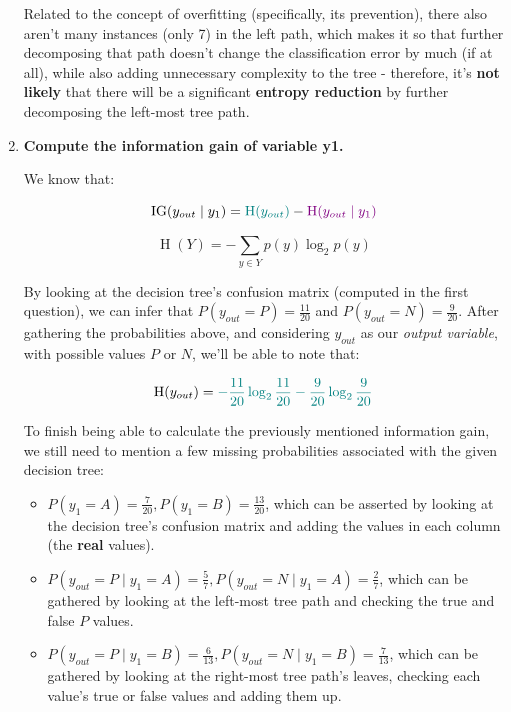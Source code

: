 \documentclass[12pt]{article}
\begin{document}
\begin{enumerate}[leftmargin=\labelsep]
        Related to the concept of overfitting (specifically, its prevention), there also aren't many
        instances (only 7) in the left path, which makes it so that further decomposing that path doesn't
        change the classification error by much (if at all), while also adding unnecessary complexity
        to the tree - therefore, it's \textbf{not likely} that there will be a significant
        \textbf{entropy reduction} by further decomposing the left-most tree path.

  \item \textbf{Compute the information gain of variable y1.}

        We know that:

        \begin{equation}
          \operatorname{IG}(y_{out} \mid y_1) = \textcolor{teal}{\operatorname{H}(y_{out})} - \textcolor{violet}{\operatorname{H}(y_{out} \mid y_1)}
        \end{equation}

        \begin{equation}
          \operatorname{H}(Y) = -\sum_{y \in Y} p(y) \log_2 p(y)
        \end{equation}

        By looking at the decision tree's confusion matrix (computed in the first question),
        we can infer that $P(y_{out} = P) = \frac{11}{20}$ and $P(y_{out} = N) = \frac{9}{20}$.
        After gathering the probabilities above, and considering $y_{out}$ as our \textit{output variable}, with possible values $P$ or $N$,
        we'll be able to note that:

        \begin{equation}
          \operatorname{H}(y_{out}) = \textcolor{teal}{- \frac{11}{20} \log_2 \frac{11}{20} - \frac{9}{20} \log_2 \frac{9}{20}}
        \end{equation}

        To finish being able to calculate the previously mentioned information gain, we still
        need to mention a few missing probabilities associated with the given decision tree:

        \begin{itemize}
          \item $P(y_1 = A) = \frac{7}{20}, P(y_1 = B) = \frac{13}{20}$,
                which can be asserted by looking at the decision tree's confusion matrix
                and adding the values in each column (the \textbf{real} values).
          \item $P(y_{out} = P \mid y_1 = A) = \frac{5}{7}, P(y_{out} = N \mid y_1 = A) = \frac{2}{7}$,
                which can be gathered by looking at the left-most tree path and checking the true
                and false $P$ values.
          \item $P(y_{out} = P \mid y_1 = B) = \frac{6}{13}, P(y_{out} = N \mid y_1 = B) = \frac{7}{13}$,
                which can be gathered by looking at the right-most tree path's leaves,
                checking each value's true or false values and adding them up.
        \end{itemize}


\end{enumerate}
\end{document}
